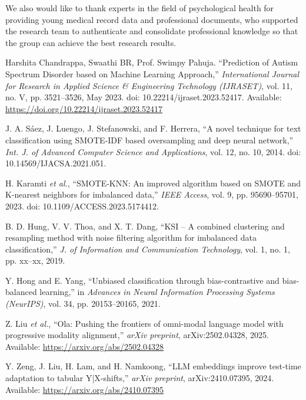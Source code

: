 \documentclass[conference]{IEEEtran}
\begin{document}
We also would like to thank experts in the field of psychological health for providing young medical record data and professional documents, who supported the research team to authenticate and consolidate professional knowledge so that the group can achieve the best research results.

\begin{thebibliography}{99}

 Harshita Chandrappa, Swaathi BR, Prof. Swimpy Pahuja. ``Prediction of Autism Spectrum Disorder based on Machine Learning Approach,'' \textit{International Journal for Research in Applied Science \& Engineering Technology (IJRASET)}, vol. 11, no. V, pp. 3521–3526, May 2023. doi: 10.22214/ijraset.2023.52417.
Available: \url{https://doi.org/10.22214/ijraset.2023.52417}

 J. A. Sáez, J. Luengo, J. Stefanowski, and F. Herrera, ``A novel technique for text classification using SMOTE-IDF based oversampling and deep neural network,'' \textit{Int. J. of Advanced Computer Science and Applications}, vol. 12, no. 10, 2014. doi: 10.14569/IJACSA.2021.051.

 H. Karamti \textit{et al.}, ``SMOTE-KNN: An improved algorithm based on SMOTE and K-nearest neighbors for imbalanced data,'' \textit{IEEE Access}, vol. 9, pp. 95690--95701, 2023. doi: 10.1109/ACCESS.2023.5174412.

 B. D. Hung, V. V. Thoa, and X. T. Dang, ``KSI – A combined clustering and resampling method with noise filtering algorithm for imbalanced data classification,'' \textit{J. of Information and Communication Technology}, vol. 1, no. 1, pp. xx--xx, 2019.

 Y. Hong and E. Yang, ``Unbiased classification through bias-contrastive and bias-balanced learning,'' in \textit{Advances in Neural Information Processing Systems (NeurIPS)}, vol. 34, pp. 20153--20165, 2021.

 Z. Liu \textit{et al.}, ``Ola: Pushing the frontiers of omni-modal language model with progressive modality alignment,'' \textit{arXiv preprint}, arXiv:2502.04328, 2025. Available: \url{https://arxiv.org/abs/2502.04328}

 Y. Zeng, J. Liu, H. Lam, and H. Namkoong, ``LLM embeddings improve test-time adaptation to tabular Y|X-shifts,'' \textit{arXiv preprint}, arXiv:2410.07395, 2024. Available: \url{https://arxiv.org/abs/2410.07395}


\end{thebibliography}
\end{document}
